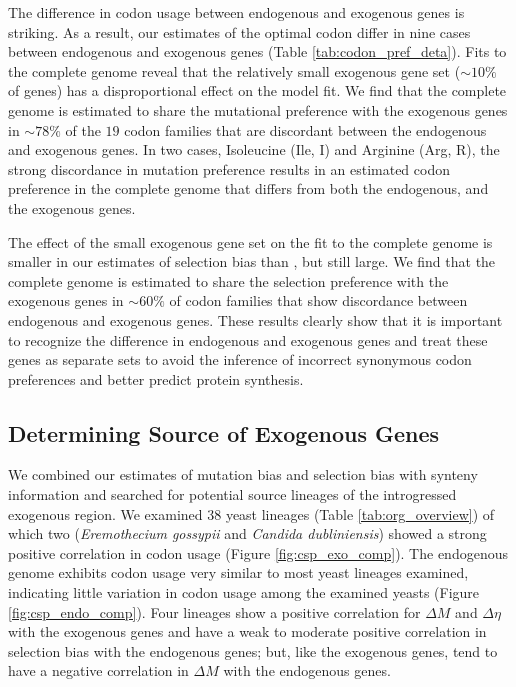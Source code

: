 The difference in codon usage between endogenous and exogenous genes is striking.
As a result, our estimates of the optimal codon differ in nine cases between endogenous and exogenous genes (Table \ref{tab:codon_pref_deta}).
Fits to the complete \kluyveri genome reveal that the relatively small exogenous gene set ($\sim 10\%$ of genes) has a disproportional effect on the model fit.
We find that the complete \kluyveri genome is estimated to share the mutational preference with the exogenous genes in $\sim78\%$ of the $19$ codon families that are discordant between the endogenous and exogenous genes.
In two cases, Isoleucine (Ile, I) and Arginine (Arg, R), the strong discordance in mutation preference results in an estimated codon preference in the complete \kluyveri genome that differs from both the endogenous, and the exogenous genes.

The effect of the small exogenous gene set on the fit to the complete \kluyveri genome is smaller in our estimates of selection bias \DE than \DM, but still large.
We find that the complete \kluyveri genome is estimated to share the selection preference with the exogenous genes in $\sim60\%$ of codon families that show discordance between endogenous and exogenous genes.
These results clearly show that it is important to recognize the difference in endogenous and exogenous genes and treat these genes as separate sets to avoid the inference of incorrect synonymous codon preferences and better predict protein synthesis.

\subsection{Determining Source of Exogenous Genes}

We combined our estimates of mutation bias \DM and selection bias \DE with synteny information and searched for potential source lineages of the introgressed exogenous region.
We examined 38 yeast lineages (Table \ref{tab:org_overview}) of which two (\emph{Eremothecium gossypii} and \emph{Candida dubliniensis}) showed a strong positive correlation in codon usage (Figure \ref{fig:csp_exo_comp}).
The endogenous \kluyveri genome exhibits codon usage very similar to most yeast lineages examined, indicating little variation in codon usage among the examined yeasts (Figure \ref{fig:csp_endo_comp}).
Four lineages show a positive correlation for $\Delta M$ and $\Delta \eta$ with the exogenous genes and have a weak to moderate positive correlation in selection bias with the endogenous genes; but, like the exogenous genes, tend to have a negative correlation in $\Delta M$ with the endogenous genes.

